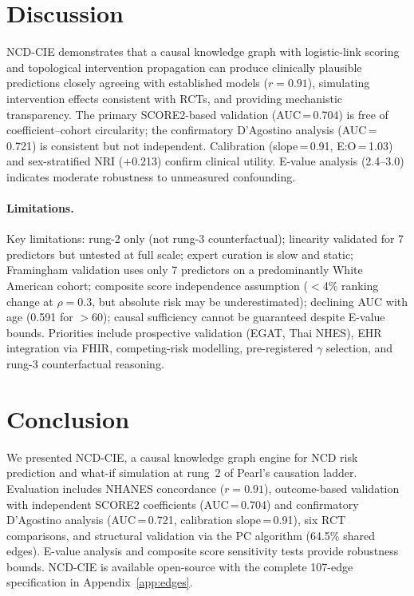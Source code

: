 \documentclass[runningheads]{llncs}
\begin{document}
\section{Discussion}\label{sec:discussion}

NCD-CIE demonstrates that a causal knowledge graph with logistic-link
scoring and topological intervention propagation can produce
clinically plausible predictions closely agreeing with established
models ($r = 0.91$), simulating intervention effects consistent with
RCTs, and providing mechanistic transparency.
The primary SCORE2-based validation (AUC\,=\,0.704) is free of
coefficient--cohort circularity; the confirmatory D'Agostino analysis
(AUC\,=\,0.721) is consistent but not independent.
Calibration (slope\,=\,0.91, E:O\,=\,1.03) and sex-stratified
NRI ($+$0.213) confirm clinical utility.
E-value analysis (2.4--3.0) indicates moderate robustness to
unmeasured confounding.

\paragraph{Limitations.}
Key limitations: rung-2 only (not rung-3 counterfactual); linearity
validated for 7 predictors but untested at full scale; expert curation
is slow and static; Framingham validation uses only 7 predictors on a
predominantly White American cohort; composite score independence
assumption ($<$4\% ranking change at $\rho=0.3$, but absolute risk
may be underestimated); declining AUC with age (0.591 for $>$60);
causal sufficiency cannot be guaranteed despite E-value bounds.
Priorities include prospective validation (EGAT, Thai NHES),
EHR integration via FHIR, competing-risk modelling,
pre-registered $\gamma$ selection, and rung-3 counterfactual
reasoning.

\section{Conclusion}\label{sec:conclusion}

We presented NCD-CIE, a causal knowledge graph engine for NCD risk
prediction and what-if simulation at rung~2 of Pearl's causation
ladder.
Evaluation includes NHANES concordance ($r = 0.91$), outcome-based
validation with independent SCORE2 coefficients (AUC\,=\,0.704)
and confirmatory D'Agostino analysis (AUC\,=\,0.721,
calibration slope\,=\,0.91), six RCT comparisons, and structural
validation via the PC algorithm (64.5\% shared edges).
E-value analysis and composite score sensitivity tests provide
robustness bounds.
NCD-CIE is available open-source with the complete 107-edge
specification in Appendix~\ref{app:edges}.
\end{document}
